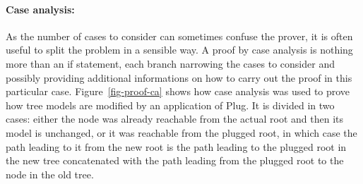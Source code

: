 \documentclass[11pt,a4paper]{article}
\begin{document}
\paragraph{Case analysis:}
As the number of cases to consider can sometimes confuse the prover, it is often useful to split the
problem in a sensible way. A proof by case analysis is nothing more than an if statement, each branch
narrowing the cases to consider and possibly providing additional informations on how to carry out
the proof in this particular case. Figure~\ref{fig-proof-ca} shows how case analysis was used to
prove how tree models are modified by an application of Plug. It is divided in two cases: either
the node was already reachable from the actual root and then its model is unchanged, or it was reachable
from the plugged root, in which case the path leading to it from the new root is the path leading to
the plugged root in the new tree concatenated with the path leading from the plugged root to the node
in the old tree.
\end{document}
